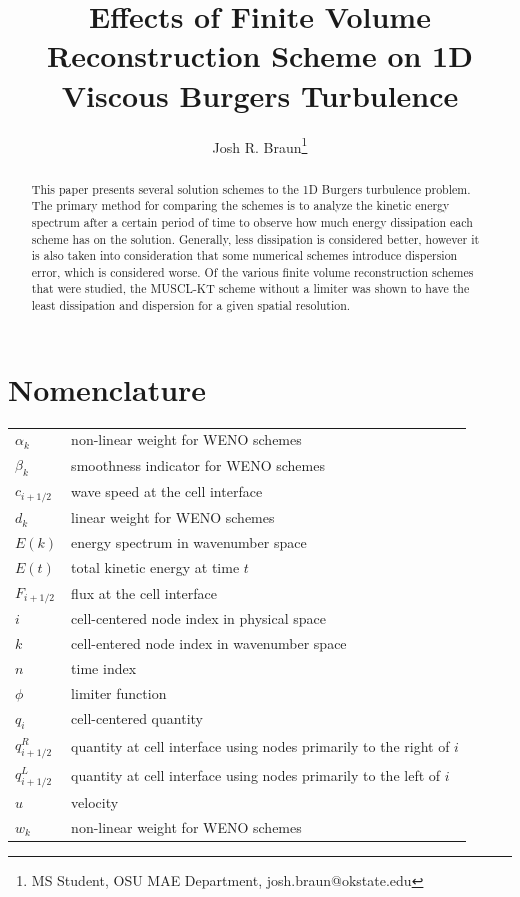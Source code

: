 \documentclass[conf]{new-aiaa}
\title{Effects of Finite Volume Reconstruction Scheme on 1D Viscous Burgers
Turbulence}
\author{Josh R. Braun\footnote{MS Student, OSU MAE Department, josh.braun@okstate.edu}}
\affil{Oklahoma State University, Stillwater, OK, 74078}
\begin{document}
\maketitle

\begin{abstract}
This paper presents several solution schemes to the 1D Burgers turbulence
problem. The primary method for comparing the schemes is to analyze the kinetic
energy spectrum after a certain period of time to observe how much energy
dissipation each scheme has on the solution. Generally, less dissipation is
considered better, however it is also taken into consideration that some
numerical schemes introduce dispersion error, which is considered worse. Of the
various finite volume reconstruction schemes that were studied, the MUSCL-KT
scheme without a limiter was shown to have the least dissipation and dispersion
for a given spatial resolution.

\end{abstract}


\section{Nomenclature}

{\renewcommand\arraystretch{1.0}
\noindent\begin{longtable*}{@{}l @{\quad=\quad} l@{}}
$\alpha_k$ & non-linear weight for WENO schemes \\
$\beta_k$ & smoothness indicator for WENO schemes \\
$c_{i+1/2}$ & wave speed at the cell interface \\
$d_k$ & linear weight for WENO schemes \\
$E(k)$ & energy spectrum in wavenumber space \\
$E(t)$ & total kinetic energy at time $t$ \\
$F_{i+1/2}$ & flux at the cell interface \\
$i$ & cell-centered node index in physical space \\
$k$ & cell-entered node index in wavenumber space \\
$n$ & time index \\
$\phi$ & limiter function \\
$q_i$ & cell-centered quantity \\
$q^R_{i+1/2}$  & quantity at cell interface using nodes primarily to the right of $i$ \\
$q^L_{i+1/2}$  & quantity at cell interface using nodes primarily to the left of $i$ \\
$u$ & velocity \\
$w_k$ & non-linear weight for WENO schemes \\
\end{longtable*}}
\end{document}
